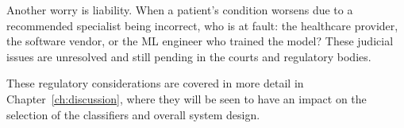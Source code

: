 Another worry is liability. When a patient's condition worsens due to a recommended specialist being incorrect, who is at fault: the healthcare provider, the software vendor, or the ML engineer who trained the model? These judicial issues are unresolved and still pending in the courts and regulatory bodies.

These regulatory considerations are covered in more detail in Chapter~\ref{ch:discussion}, where they will be seen to have an impact on the selection of the classifiers and overall system design.
